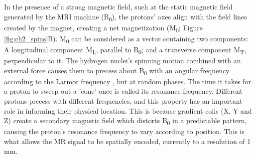 In the presence of a strong magnetic field, such at the static magnetic field generated by the MRI machine (B\textsubscript{0}), the protons’ axes align with the field lines created by the magnet, creating a net magnetization (M\textsubscript{0}; Figure \ref{fig:ch2_spins}B). 
M\textsubscript{0} can be considered as a vector containing two components: A longitudinal component M\textsubscript{L},  parallel to B\textsubscript{0}; and a transverse component M\textsubscript{T}, perpendicular to it. 
The hydrogen nuclei’s spinning motion combined with an external force causes them to precess about B\textsubscript{0} with an angular frequency according to the Larmor frequency \citep{Larmor1897}, but at random phases. 
The time it takes for a proton to sweep out a ’cone’ once is called its resonance frequency. Different protons precess with different frequencies, and this property has an important role in informing their physical location. 
This is because gradient coils (X, Y and Z) create a secondary magnetic field which distorts B\textsubscript{0} in a predictable pattern, causing the proton’s resonance frequency to vary according to position. 
This is what allows the MR signal to be spatially encoded, currently to a resolution of 1 mm.




